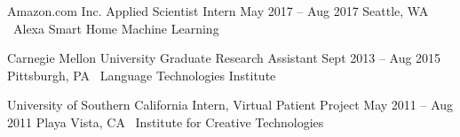 \begin{cventries}
  \cventry
    {Amazon.com Inc.} %
    {Applied Scientist Intern} %
    {May 2017 – Aug 2017} %
    {Seattle, WA} %
    {~Alexa Smart Home Machine Learning
    }

  \cventry
   {Carnegie Mellon University} %
    {Graduate Research Assistant} %
    {Sept 2013 – Aug 2015} %
    {Pittsburgh, PA} %
    {~Language Technologies Institute
    }

  \cventry
   {University of Southern California} %
    {Intern, Virtual Patient Project} %
    {May 2011 – Aug 2011} %
    {Playa Vista, CA} %
    {~Institute for Creative Technologies}


\end{cventries}
